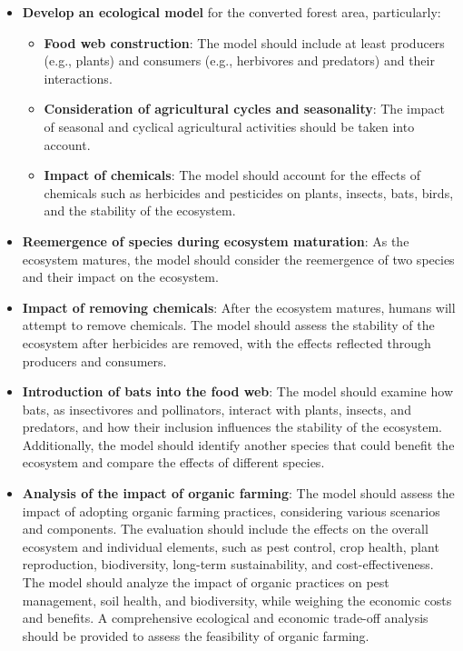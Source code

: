 \documentclass{HZNUMCM}
\begin{document}
      \begin{itemize}
        \item \textbf{Develop an ecological model} for the converted forest area, particularly:
          \begin{itemize}
            \item \textbf{Food web construction}: The model should include at least producers (e.g., plants) and consumers (e.g., herbivores and predators) and their interactions.
            \item \textbf{Consideration of agricultural cycles and seasonality}: The impact of seasonal and cyclical agricultural activities should be taken into account.
            \item \textbf{Impact of chemicals}: The model should account for the effects of chemicals such as herbicides and pesticides on plants, insects, bats, birds, and the stability of the ecosystem.
          \end{itemize}
        \item \textbf{Reemergence of species during ecosystem maturation}: As the ecosystem matures, the model should consider the reemergence of two species and their impact on the ecosystem.
        \item \textbf{Impact of removing chemicals}: After the ecosystem matures, humans will attempt to remove chemicals. The model should assess the stability of the ecosystem after herbicides are removed, with the effects reflected through producers and consumers.
        \item \textbf{Introduction of bats into the food web}: The model should examine how bats, as insectivores and pollinators, interact with plants, insects, and predators, and how their inclusion influences the stability of the ecosystem. Additionally, the model should identify another species that could benefit the ecosystem and compare the effects of different species.
        \item \textbf{Analysis of the impact of organic farming}: The model should assess the impact of adopting organic farming practices, considering various scenarios and components. The evaluation should include the effects on the overall ecosystem and individual elements, such as pest control, crop health, plant reproduction, biodiversity, long-term sustainability, and cost-effectiveness. The model should analyze the impact of organic practices on pest management, soil health, and biodiversity, while weighing the economic costs and benefits. A comprehensive ecological and economic trade-off analysis should be provided to assess the feasibility of organic farming.
      \end{itemize}
\end{document}
